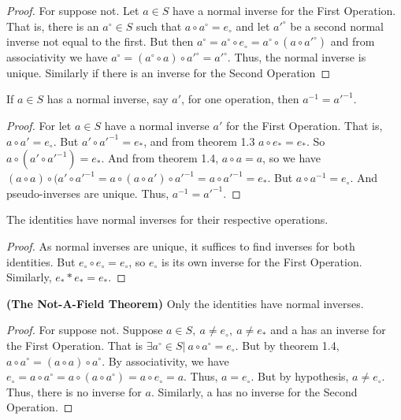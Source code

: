             \begin{proof} For suppose not. Let $a\in S$ have a normal inverse for the First Operation. That is, there is an $a^{\circ}\in S$ such that $a\circ a^{\circ}=e_{\circ}$ and let $a'^{\circ}$ be a second normal inverse not equal to the first. But then $a^{\circ}=a^{\circ}\circ e_{\circ}=a^{\circ}\circ (a\circ a'^{\circ})$ and from associativity we have $a^{\circ}=(a^{\circ}\circ a)\circ a'^{\circ}=a'^{\circ}$. Thus, the normal inverse is unique. Similarly if there is an inverse for the Second Operation
            \end{proof}
            \begin{theorem} If $a\in S$ has a normal inverse, say $a'$, for one operation, then $a^{-1}=a'^{-1}$.
            \end{theorem}
            \begin{proof} For let $a\in S$ have a normal inverse $a'$ for the First Operation. That is, $a\circ a' = e_{\circ}$. But $a' \circ a'^{-1}=e_{*}$, and from theorem 1.3 $a\circ e_{*}=e_{*}$. So $a\circ (a' \circ a'^{-1})=e_{*}$. And from theorem 1.4, $a\circ a=a$, so we have $(a\circ a)\circ (a'\circ a'^{-1}=a\circ (a\circ a')\circ a'^{-1}=a\circ a'^{-1}=e_{*}$. But $a\circ a^{-1}=e_{\circ}$. And pseudo-inverses are unique. Thus, $a^{-1}=a'^{-1}$. 
            \end{proof}
            \begin{theorem} The identities have normal inverses for their respective operations.
            \end{theorem}
            \begin{proof} As normal inverses are unique, it suffices to find inverses for both identities. But $e_{\circ}\circ e_{\circ}=e_{\circ}$, so $e_{\circ}$ is its own inverse for the First Operation. Similarly, $e_{*}*e_{*}=e_{*}$.
            \end{proof}
            \begin{theorem} \textbf{(The Not-A-Field Theorem)} Only the identities have normal inverses.
            \end{theorem}
            \begin{proof} For suppose not. Suppose $a\in S,\ a\ne e_{\circ},\ a\ne e_{*}$ and a has an inverse for the First Operation. That is $\exists a^{\circ}\in S|\ a\circ a^{\circ}=e_{\circ}$. But by theorem 1.4, $a\circ a^{\circ}=(a\circ a)\circ a^{\circ}$. By associativity, we have $e_{\circ}=a\circ a^{\circ} = a\circ (a\circ a^{\circ})=a\circ e_{\circ}=a$. Thus, $a=e_{\circ}$. But by hypothesis, $a\ne e_{\circ}$. Thus, there is no inverse for $a$. Similarly, a has no inverse for the Second Operation.
            \end{proof}
